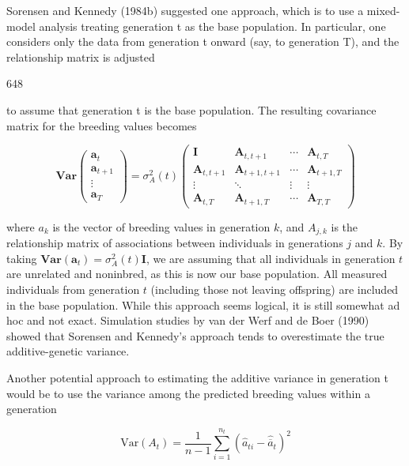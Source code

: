 \documentclass{article}
\begin{document}
Sorensen and Kennedy (1984b) suggested one approach, which is to use a mixed-model analysis treating generation t as the base population. In particular, one considers only the data from generation t onward (say, to generation T), and the relationship matrix is adjusted

648

to assume that generation t is the base population. The resulting covariance matrix for the breeding values becomes

\begin{equation}
\mathbf{V a r}\begin{pmatrix}\mathbf{a}_{t}\\ \mathbf{a}_{t+1}\\ \vdots\\ \mathbf{a}_{T}\end{pmatrix}=\sigma_{A}^{2}(t)\begin{pmatrix}\mathbf{I}&\mathbf{A}_{t,t+1}&\cdots&\mathbf{A}_{t,T}\\ \mathbf{A}_{t,t+1}&\mathbf{A}_{t+1,t+1}&\cdots&\mathbf{A}_{t+1,T}\\ \vdots&\ddots&\vdots&\vdots\\ \mathbf{A}_{t,T}&\mathbf{A}_{t+1,T}&\cdots&\mathbf{A}_{T,T}\end{pmatrix}
\tag{19.13}
\label{eq:19_13}
\end{equation}

where  $ a_k $ is the vector of breeding values in generation  $ k $, and  $ A_{j,k} $ is the relationship matrix of associations between individuals in generations  $ j $ and  $ k $. By taking  $ \mathbf{Var}(\mathbf{a}_t) = \sigma_A^2(t)\mathbf{I} $, we are assuming that all individuals in generation  $ t $ are unrelated and noninbred, as this is now our base population. All measured individuals from generation  $ t $ (including those not leaving offspring) are included in the base population. While this approach seems logical, it is still somewhat ad hoc and not exact. Simulation studies by van der Werf and de Boer (1990) showed that Sorensen and Kennedy's approach tends to overestimate the true additive-genetic variance.

Another potential approach to estimating the additive variance in generation t would be to use the variance among the predicted breeding values within a generation

\begin{equation}
\mathrm{Var}(A_{t})=\frac{1}{n-1}\sum_{i=1}^{n_{t}}\left(\widehat{a}_{ti}-\widehat{\overline{a}}_{t}\right)^{2}
\tag{19.14}
\label{eq:19_14}
\end{equation}
\end{document}
